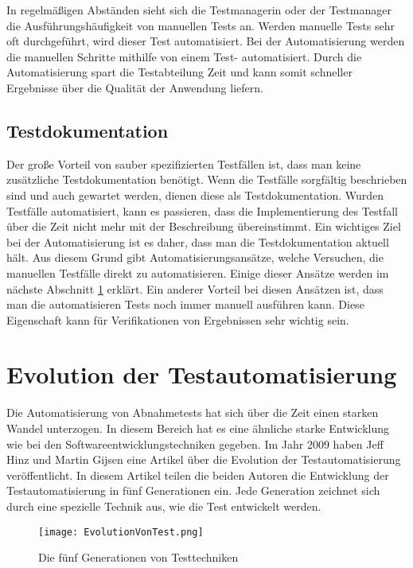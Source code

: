 In regelmäßigen Abständen sieht sich die Testmanagerin oder der Testmanager die Ausführungshäufigkeit von manuellen Tests an. Werden manuelle Tests sehr oft durchgeführt, wird dieser Test automatisiert. Bei der Automatisierung werden die manuellen Schritte mithilfe von einem Test- automatisiert. Durch die Automatisierung spart die Testabteilung Zeit und kann somit schneller Ergebnisse über die Qualität der Anwendung liefern.

\subsection{Testdokumentation}

Der große Vorteil von sauber spezifizierten Testfällen ist, dass man keine zusätzliche Testdokumentation benötigt. Wenn die Testfälle sorgfältig beschrieben sind und auch gewartet werden, dienen diese als Testdokumentation. Wurden Testfälle automatisiert, kann es passieren, dass die Implementierung des Testfall über die Zeit nicht mehr mit der Beschreibung übereinstimmt. Ein wichtiges Ziel bei der Automatisierung ist es daher, dass man die Testdokumentation aktuell hält. Aus diesem Grund gibt Automatisierungsansätze, welche Versuchen, die manuellen Testfälle direkt zu automatisieren. Einige dieser Ansätze werden im nächste Abschnitt \ref{cha:evolution} erklärt. Ein anderer Vorteil bei diesen Ansätzen ist, dass man die automatisieren Tests noch immer manuell ausführen kann. Diese Eigenschaft kann für Verifikationen von Ergebnissen sehr wichtig sein.

\section{Evolution der Testautomatisierung}
\label{cha:evolution}

Die Automatisierung von Abnahmetests hat sich über die Zeit einen starken Wandel unterzogen. In diesem Bereich hat es eine ähnliche starke Entwicklung wie bei den Softwareentwicklungstechniken gegeben. Im Jahr 2009 haben Jeff Hinz und Martin Gijsen eine Artikel \cite{Hinz09} über die Evolution der Testautomatisierung veröffentlicht. In diesem Artikel teilen die beiden Autoren die Entwicklung der Testautomatisierung in fünf Generationen ein. Jede Generation zeichnet sich durch eine spezielle Technik aus, wie die Test entwickelt werden. 

\begin{figure}
\centering
\texttt{[image: EvolutionVonTest.png]}
\caption{Die fünf Generationen von Testtechniken}
\label{fig:testEvolution}
\end{figure}

